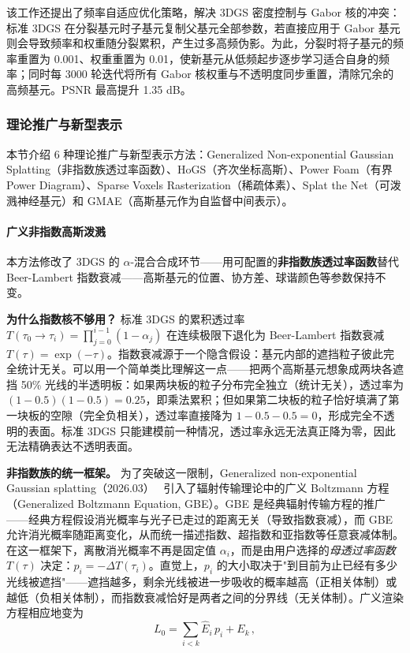 该工作还提出了频率自适应优化策略，解决 3DGS 密度控制与 Gabor 核的冲突：标准 3DGS 在分裂基元时子基元复制父基元全部参数，若直接应用于 Gabor 基元则会导致频率和权重随分裂累积，产生过多高频伪影。为此，分裂时将子基元的频率重置为 0.001、权重重置为 0.01，使新基元从低频起步逐步学习适合自身的频率；同时每 3000 轮迭代将所有 Gabor 核权重与不透明度同步重置，清除冗余的高频基元。PSNR 最高提升 1.35 dB。

\subsubsection{理论推广与新型表示}

本节介绍 6 种理论推广与新型表示方法：Generalized Non-exponential Gaussian Splatting（非指数族透过率函数）、HoGS（齐次坐标高斯）、Power Foam（有界 Power Diagram）、Sparse Voxels Rasterization（稀疏体素）、Splat the Net（可泼溅神经基元）和 GMAE（高斯基元作为自监督中间表示）。

\paragraph{广义非指数高斯泼溅}

本方法修改了 3DGS 的 $\alpha$-混合合成环节——用可配置的\textbf{非指数族透过率函数}替代 Beer-Lambert 指数衰减——高斯基元的位置、协方差、球谐颜色等参数保持不变。

\textbf{为什么指数核不够用？}
标准 3DGS 的累积透过率 $T(\tau_0 \to \tau_i) = \prod_{j=0}^{i-1}(1-\alpha_j)$ 在连续极限下退化为 Beer-Lambert 指数衰减 $T(\tau) = \exp(-\tau)$。指数衰减源于一个隐含假设：基元内部的遮挡粒子彼此完全统计无关。可以用一个简单类比理解这一点——把两个高斯基元想象成两块各遮挡 50\% 光线的半透明板：如果两块板的粒子分布完全独立（统计无关），透过率为 $(1-0.5)(1-0.5) = 0.25$，即乘法累积；但如果第二块板的粒子恰好填满了第一块板的空隙（完全负相关），透过率直接降为 $1 - 0.5 - 0.5 = 0$，形成完全不透明的表面。标准 3DGS 只能建模前一种情况，透过率永远无法真正降为零，因此无法精确表达不透明表面。

\textbf{非指数族的统一框架。}
为了突破这一限制，Generalized non-exponential Gaussian splatting（2026.03）~\cite{2603_02887} 引入了辐射传输理论中的广义 Boltzmann 方程（Generalized Boltzmann Equation, GBE）。GBE 是经典辐射传输方程的推广——经典方程假设消光概率与光子已走过的距离无关（导致指数衰减），而 GBE 允许消光概率随距离变化，从而统一描述指数、超指数和亚指数等任意衰减体制。在这一框架下，离散消光概率不再是固定值 $\alpha_i$，而是由用户选择的\emph{母透过率函数} $T(\tau)$ 决定：$p_i = -\Delta T(\tau_i)$。直觉上，$p_i$ 的大小取决于"到目前为止已经有多少光线被遮挡"——遮挡越多，剩余光线被进一步吸收的概率越高（正相关体制）或越低（负相关体制），而指数衰减恰好是两者之间的分界线（无关体制）。广义渲染方程相应地变为
\begin{equation}
L_0 = \sum_{i<k} \hat{E}_i\, p_i + E_k\,,
\end{equation}

